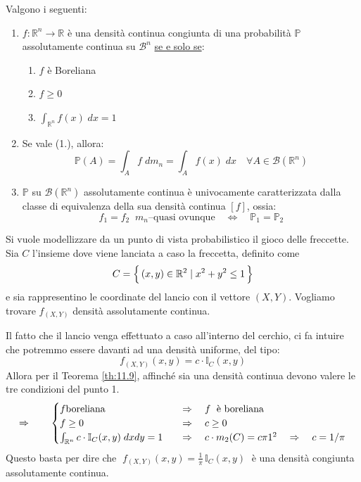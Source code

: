 \begin{teorema}
Valgono i seguenti:
\begin{enumerate}
\label{th:11.9}
    \item $f:\mathbb{R}^n\to\mathbb{R}$ è una densità continua congiunta di una probabilità $\mathbb{P}$ assolutamente continua su $\mathcal{B}^n$ \underline{se e solo se}:
    \begin{enumerate}
        \item $f$ è Boreliana
        \item $f\geq0$
        \item $\int_{\mathbb{R}^n}f(x)\;dx = 1$
    \end{enumerate}
    \item Se vale (1.), allora:
    \[\mathbb{P}(A) = \int_Af\;dm_n = \int_A f(x)\;dx\quad \forall A\in \mathcal{B}(\mathbb{R}^n)\]
    \item $\mathbb{P}$ su $\mathcal{B}(\mathbb{R}^n)$ assolutamente continua è univocamente caratterizzata dalla classe di equivalenza della sua densità continua $[f]$, ossia:
    \[f_1=f_2\;\;m_n\text{--quasi ovunque}\quad \iff \quad \mathbb{P}_1 = \mathbb{P}_2\]
\end{enumerate}
\end{teorema}

\begin{esempio}
    Si vuole modellizzare da un punto di vista probabilistico il gioco delle freccette. Sia $C$ l'insieme dove viene lanciata a caso la freccetta, definito come
    \[C = \Bigl\{\,(x, y)\in\mathbb{R}^2\mid x^2+y^2\leq1\,\Bigr\}\]
    e sia rappresentino le coordinate del lancio con il vettore $(X, Y)$. Vogliamo trovare $f_{(X, Y)}$ densità assolutamente continua.

    \medskip
    \noindent Il fatto che il lancio venga effettuato a caso all'interno del cerchio, ci fa intuire che potremmo essere davanti ad una densità uniforme, del tipo:
    \[f_{(X, Y)}(x, y) = c\cdot \mathbb{I}_C(x, y)\]
    Allora per il Teorema \ref{th:11.9}, affinché sia una densità continua devono valere le tre condizioni del punto 1.
    \[\Rightarrow\qquad \begin{cases}
        f \text{boreliana}\quad &\Rightarrow \quad f \text{\; è boreliana}\\
        f\geq0 \quad &\Rightarrow \quad c\geq 0\\
        \int_{\mathbb{R}^n} c\cdot \mathbb{I}_C(x, y)\;dxdy = 1 \quad &\Rightarrow \quad c\cdot m_2(C) = c\pi 1^2 \quad \Rightarrow \quad c = 1/\pi
    \end{cases}\]
    Questo basta per dire che $\;f_{(X, Y)}(x, y) = \frac{1}{\pi}\,\mathbb{I}_C(x, y)\;$ è una densità congiunta assolutamente continua.
\end{esempio}

